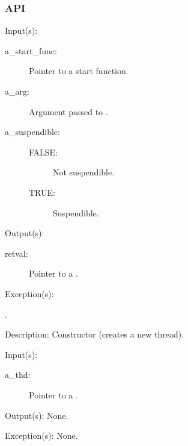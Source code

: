 \subsubsection{API}
\begin{capi}
\label{thd_new}
	\begin{capilist}
	\item[Input(s): ]
		\begin{description}\item[]
		\item[a\_start\_func: ] Pointer to a start function.
		\item[a\_arg: ] Argument passed to .
		\item[a\_suspendible: ]
		\begin{description}\item[]
			\item[FALSE: ] Not suspendible.
			\item[TRUE: ] Suspendible.
		\end{description}
		\end{description}
	\item[Output(s): ]
		\begin{description}\item[]
		\item[retval: ] Pointer to a .
		\end{description}
	\item[Exception(s): ]
		\begin{description}\item[]
		\item[.]
		\end{description}
	\item[Description: ]
		Constructor (creates a new thread).
	\end{capilist}
\label{thd_delete}
	\begin{capilist}
	\item[Input(s): ]
		\begin{description}\item[]
		\item[a\_thd: ] Pointer to a \classname{thd}.
		\end{description}
	\item[Output(s): ] None.
	\item[Exception(s): ] None.

\end{capilist}
\end{capi}
